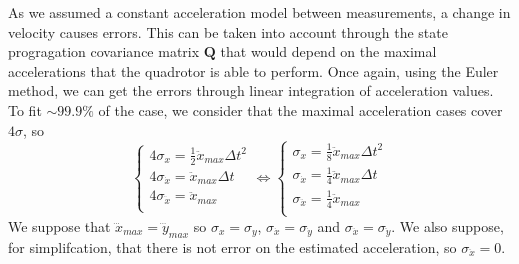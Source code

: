 \documentclass[12pt]{article}
\begin{document}
As we assumed a constant acceleration model between measurements, a change in velocity causes errors.
This can be taken into account through the state progragation covariance matrix $\mathbf{Q}$ that would depend on the maximal accelerations that the quadrotor is able to perform.
Once again, using the Euler method, we can get the errors through linear integration of acceleration values.
To fit $\sim 99.9\%$ of the case, we consider that the maximal acceleration cases cover $4\sigma$, so
\begin{equation}
\left\{
    \begin{array}{l}
    4 \sigma_x = \frac{1}{2} \ddot{x}_{max} \Delta{t}^2 \\
    4 \sigma_{\dot{x}} = \ddot{x}_{max} \Delta{t} \\
    4 \sigma_{\ddot{x}} = \ddot{x}_{max} \\
    \end{array}
\right.
\Leftrightarrow
\left\{
    \begin{array}{l}
    \sigma_x = \frac{1}{8} \ddot{x}_{max} \Delta{t}^2 \\
    \sigma_{\dot{x}} = \frac{1}{4} \ddot{x}_{max} \Delta{t} \\
    \sigma_{\ddot{x}} = \frac{1}{4} \ddot{x}_{max} \\
    \end{array}
\right.
\end{equation}
We suppose that $\dddot{x}_{max} = \dddot{y}_{max}$ so $\sigma_x = \sigma_y$, $\sigma_{\dot{x}} = \sigma_{\dot{y}}$ and $\sigma_{\ddot{x}} = \sigma_{\ddot{y}}$.
We also suppose, for simplifcation, that there is not error on the estimated acceleration, so $\sigma_{\ddot{x}} = 0$.
\end{document}
